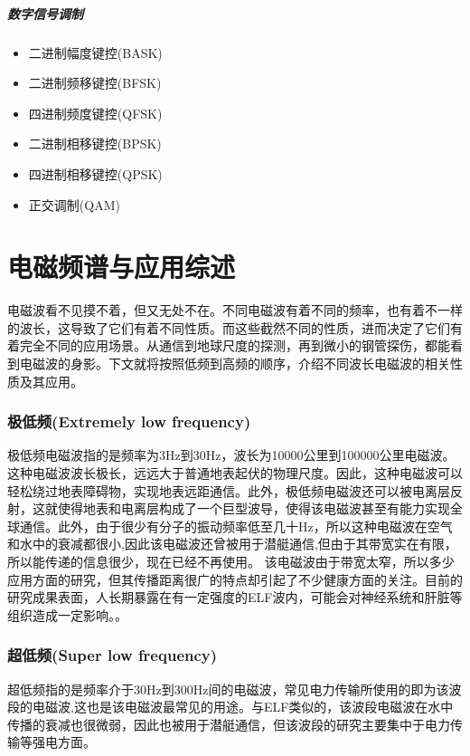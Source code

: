 \documentclass[UTF8]{article}
\begin{document}
\begin{CJK}{UTF8}{gkai}
\subsubsection{数字信号调制}
\begin{itemize}
\item  二进制幅度键控(BASK)
\item  二进制频移键控(BFSK)
\item  四进制频度键控(QFSK)
\item  二进制相移键控(BPSK)
\item  四进制相移键控(QPSK)
\item  正交调制(QAM)
\end{itemize}
\clearpage
\part{电磁频谱与应用综述}
电磁波看不见摸不着，但又无处不在。不同电磁波有着不同的频率，也有着不一样的波长，这导致了它们有着不同性质。而这些截然不同的性质，进而决定了它们有着完全不同的应用场景。从通信到地球尺度的探测，再到微小的钢管探伤，都能看到电磁波的身影。下文就将按照低频到高频的顺序，介绍不同波长电磁波的相关性质及其应用。
\setcounter{section}{0}
\section{极低频(Extremely low frequency)}
极低频电磁波指的是频率为3Hz到30Hz，波长为10000公里到100000公里电磁波。这种电磁波波长极长，远远大于普通地表起伏的物理尺度。因此，这种电磁波可以轻松绕过地表障碍物，实现地表远距通信。此外，极低频电磁波还可以被电离层反射，这就使得地表和电离层构成了一个巨型波导，使得该电磁波甚至有能力实现全球通信。此外，由于很少有分子的振动频率低至几十Hz，所以这种电磁波在空气和水中的衰减都很小\cite{Jursa1985Handbook},因此该电磁波还曾被用于潜艇通信\cite{Barr2000ELF},但由于其带宽实在有限，所以能传递的信息很少，现在已经不再使用。
该电磁波由于带宽太窄，所以多少应用方面的研究，但其传播距离很广的特点却引起了不少健康方面的关注。目前的研究成果表面，人长期暴露在有一定强度的ELF波内，可能会对神经系统和肝脏等组织造成一定影响。\cite{赵龙宇2012工作场所极低频电磁辐射对作业人员健康状况影响的调查分析,刘欣2013极低频电磁场暴露对从业人员肝脏功能的影响}。
\section{超低频(Super low frequency)}
超低频指的是频率介于30Hz到300Hz间的电磁波，常见电力传输所使用的即为该波段的电磁波,这也是该电磁波最常见的用途。与ELF类似的，该波段电磁波在水中传播的衰减也很微弱，因此也被用于潜艇通信，但该波段的研究主要集中于电力传输等强电方面。

\end{CJK}
\end{document}
